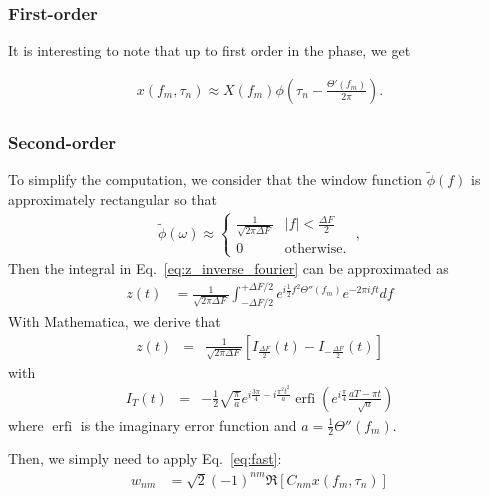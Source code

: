 \documentclass{article}
\begin{document}
\subsubsection{First-order}
It is interesting to note that up to first order in the phase, we get

\begin{align}
\label{eq:wdft-continuous-taylor-first-order}
    x(f_m, \tau_n) \approx X(f_m) \phi\left(\tau_n - \frac{\Theta'(f_m)}{2 \pi} \right).
\end{align}

\subsubsection{Second-order}

To simplify the computation, we consider that the window function $\tilde{\phi}(f)$ is approximately rectangular so that
\begin{align}
\label{eq:meyer_window_freq_approx}
\tilde\phi(\omega) \approx \left\{\begin{array}{lr}
\frac{1}{\sqrt{2 \pi \Delta F }} & |f| < \frac{\Delta F}{2}\\
0 & \text{otherwise.}
\end{array}\right.\;,
\end{align}
Then the integral in Eq.~\eqref{eq:z_inverse_fourier} can be approximated as
\begin{align}
\label{eq:z_inverse_fourier-2}
    z(t) & = \frac{1}{\sqrt{2 \pi \Delta F }} \int_{-\Delta F/2}^{+\Delta F/2} e^{i\frac{1}{2} f^2 \Theta''(f_m)} e^{-2\pi i f t} df
\end{align}
 With Mathematica, we derive that 
\begin{eqnarray}
    z(t) & = & \frac{1}{\sqrt{2 \pi \Delta F }} \left[I_{\frac{\Delta F}{2}}(t) - I_{-\frac{\Delta F}{2}}(t)  \right] 
\end{eqnarray}
with
\begin{eqnarray}
    I_{T}(t) & = & -\frac{1}{2} \sqrt{\frac{\pi}{a}} e^{i\frac{3 \pi}{4} - i \frac{\pi^2 t^2}{a}} \operatorname{erfi}\left( e^{i\frac{\pi}{4}} \frac{aT - \pi t}{\sqrt{a}}\right)
\end{eqnarray}
where $\operatorname{erfi}$ is the imaginary error function and $a = \frac{1}{2} \Theta''(f_m)$.

Then, we simply need to apply Eq.~\eqref{eq:fast}:
\begin{align}
\label{eq:fast-2}
    w_{nm} & =\sqrt{2}(-1)^{nm}\Re\left[C_{nm} x(f_m, \tau_n)\right] \nonumber \\
\end{align}
\end{document}
